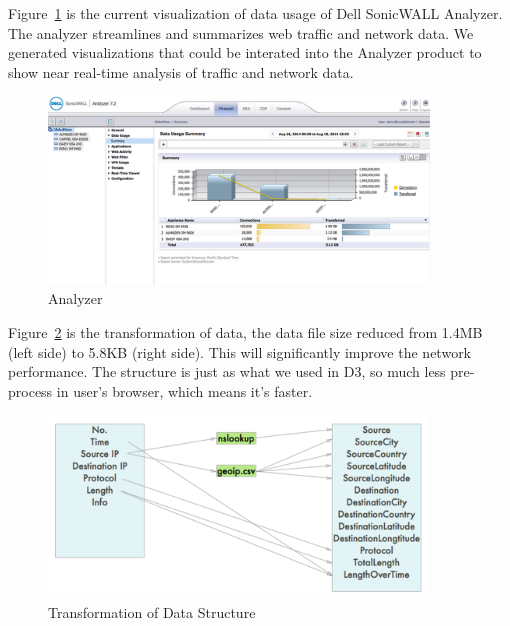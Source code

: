 \documentclass[paper=a4, fontsize=11pt]{report} %
\begin{document}
\begin{description}[style=nextline]
    \item[\href{http://www.sonicwall.com/us/en/products/Firewall-Analyzer.html}{Analyzer}]
    Figure~\ref{fig:analyzer} is the current visualization of data usage of Dell SonicWALL Analyzer. The analyzer streamlines and summarizes web traffic and network data. We generated visualizations that could be interated into the Analyzer product to show near real-time analysis of traffic and network data.
    \begin{figure}[H]
        \begin{center}
            \includegraphics[width=0.9\textwidth]{analyzer.png}
        \end{center}
        \caption{Analyzer}\label{fig:analyzer}
    \end{figure}

    \item[\href{http://sjengle.cs.usfca.edu/cs690-sonicwall/}{Transformation of Data}]
    Figure~\ref{fig:datastructure} is the transformation of data, the data file size reduced from 1.4MB (left side) to 5.8KB (right side). This will significantly improve the network performance. The structure is just as what we used in D3, so much less pre-process in user's browser, which means it's faster.
    \begin{figure}[H]
        \begin{center}
            \includegraphics[width=0.9\textwidth]{datastructure.png}
        \end{center}
        \caption{Transformation of Data Structure}\label{fig:datastructure}
    \end{figure}


\end{description}
\end{document}
